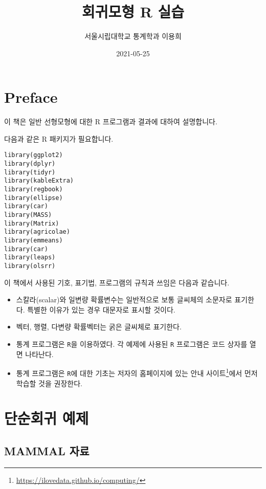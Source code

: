 \documentclass[
]{book}
\title{회귀모형 R 실습}
\author{서울시립대학교 통계학과 이용희}
\date{2021-05-25}
\makeatletter
\providecommand{\tightlist}{%
  \setlength{\itemsep}{0pt}\setlength{\parskip}{0pt}}
\renewcommand{\href}[2]{#2\footnote{\url{#1}}}
\newenvironment{kframe}{%
\medskip{}
\setlength{\fboxsep}{.8em}
 \def\at@end@of@kframe{}%
 \ifinner\ifhmode%
  \def\at@end@of@kframe{\end{minipage}}%
  \begin{minipage}{\columnwidth}%
 \fi\fi%
 \def\FrameCommand##1{\hskip\@totalleftmargin \hskip-\fboxsep
 \colorbox{shadecolor}{##1}\hskip-\fboxsep
     \hskip-\linewidth \hskip-\@totalleftmargin \hskip\columnwidth}%
 \MakeFramed {\advance\hsize-\width
   \@totalleftmargin\z@ \linewidth\hsize
   \@setminipage}}%
 {\par\unskip\endMakeFramed%
 \at@end@of@kframe}
\newenvironment{rmdblock}[1]
  {
  \begin{itemize}
  \renewcommand{\labelitemi}{
    \raisebox{-.7\height}[0pt][0pt]{
      {\setkeys{Gin}{width=3em,keepaspectratio}\texttt{[image: images/\#1]}}
    }
  }
  \setlength{\fboxsep}{1em}
  \begin{kframe}
  \item
  }
  {
  \end{kframe}
  \end{itemize}
  }
\newenvironment{rmdimportant}
  {\begin{rmdblock}{important}}
  {\end{rmdblock}}
\makeatother
\begin{document}
\maketitle

{
\setcounter{tocdepth}{1}
\tableofcontents
}
\hypertarget{preface}{%
\chapter*{Preface}\label{preface}}


이 책은 일반 선형모형에 대한 R 프로그램과 결과에 대하여 설명합니다.

다음과 같은 R 패키지가 필요합니다.

\begin{verbatim}
library(ggplot2)
library(dplyr)
library(tidyr)
library(kableExtra)
library(regbook)
library(ellipse)
library(car)
library(MASS)
library(Matrix)
library(agricolae)
library(emmeans)
library(car)
library(leaps)
library(olsrr)
\end{verbatim}

\begin{rmdimportant}
이 책에서 사용된 기호, 표기법, 프로그램의 규칙과 쓰임은 다음과 같습니다.

\begin{itemize}
\tightlist
\item
  스칼라(scalar)와 일변량 확률변수는 일반적으로 보통 글씨체의 소문자로 표기한다. 특별한 이유가 있는 경우 대문자로 표시할 것이다.
\item
  벡터, 행렬, 다변량 확률벡터는 굵은 글씨체로 표기한다.
\item
  통계 프로그램은 \texttt{R}을 이용하였다. 각 예제에 사용된 \texttt{R} 프로그램은 코드 상자를 열면 나타난다.
\item
  통계 프로그램은 \texttt{R}에 대한 기초는 저자의 홈페이지에 있는 \href{https://ilovedata.github.io/computing/}{안내 사이트}에서 먼저 학습할 것을 권장한다.
\end{itemize}
\end{rmdimportant}

\hypertarget{chap02}{%
\chapter{단순회귀 예제}\label{chap02}}

\hypertarget{mammal-uxc790uxb8cc}{%
\section{MAMMAL 자료}\label{mammal-uxc790uxb8cc}}
\end{document}
